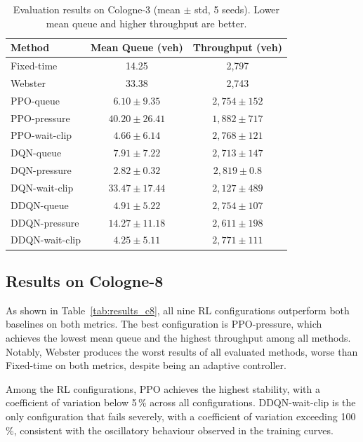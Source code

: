 \begin{table}[htbp]
    \caption{Evaluation results on Cologne-3 (mean $\pm$ std, 5 seeds).
             Lower mean queue and higher throughput are better.}
    \label{tab:results_c3}
    \centering
    \begin{tabular}{lcc}
        \toprule
        \textbf{Method}
            & \textbf{Mean Queue (veh)}
            & \textbf{Throughput (veh)} \\
        \midrule
        Fixed-time       & 14.25             & 2{,}797 \\
        Webster          & 33.38             & 2{,}743 \\
        \midrule
        PPO-queue        & $6.10 \pm 9.35$   & $2{,}754 \pm 152$ \\
        PPO-pressure     & $40.20 \pm 26.41$ & $1{,}882 \pm 717$ \\
        PPO-wait-clip    & $4.66 \pm 6.14$   & $2{,}768 \pm 121$ \\
        \midrule
        DQN-queue        & $7.91 \pm 7.22$   & $2{,}713 \pm 147$ \\
        DQN-pressure     & $2.82 \pm 0.32$   & $2{,}819 \pm 0.8$ \\
        DQN-wait-clip    & $33.47 \pm 17.44$ & $2{,}127 \pm 489$ \\
        \midrule
        DDQN-queue       & $4.91 \pm 5.22$   & $2{,}754 \pm 107$ \\
        DDQN-pressure    & $14.27 \pm 11.18$ & $2{,}611 \pm 198$ \\
        DDQN-wait-clip   & $4.25 \pm 5.11$   & $2{,}771 \pm 111$ \\
        \bottomrule
    \end{tabular}
\end{table}

\subsection{Results on Cologne-8}

As shown in Table~\ref{tab:results_c8}, all nine RL configurations outperform
both baselines on both metrics. The best configuration is PPO-pressure, which
achieves the lowest mean queue and the highest throughput among all methods.
Notably, Webster produces the worst results of all evaluated methods, worse
than Fixed-time on both metrics, despite being an adaptive controller.

Among the RL configurations, PPO achieves the highest stability, with a
coefficient of variation below 5\,\% across all configurations. DDQN-wait-clip
is the only configuration that fails severely, with a coefficient of variation
exceeding 100\,\%, consistent with the oscillatory behaviour observed in the
training curves.

